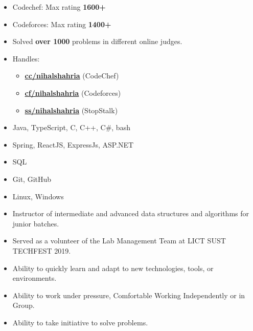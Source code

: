 \smallskip
\begin{itemize}
	\item Codechef: Max rating \textbf{1600+}
	\item Codeforces: Max rating \textbf{1400+}
	\item Solved \textbf{over 1000} problems in different online judges.
	\item Handles:
	      \begin{itemize}
	      	\item \href{https://www.codechef.com/users/nihalshahria}{\textbf{cc/nihalshahria}} (CodeChef)
	      	\item \href{https://codeforces.com/profile/nihalshahria}{\textbf {cf/nihalshahria}} (Codeforces)
	      	\item \href{https://www.stopstalk.com/user/profile/nihalshahria}{\textbf{ss/nihalshahria}} (StopStalk)
	      \end{itemize}
	              
\end{itemize}
\smallskip


\smallskip
\begin{itemize}
	\item Java, TypeScript, C, C++, C\#, bash
	\item Spring, ReactJS, ExpressJs, ASP.NET 
	\item SQL
	\item Git, GitHub
	\item Linux, Windows
\end{itemize}

\smallskip
\begin{itemize}
	\item Instructor of intermediate and advanced data structures and algorithms for junior batches.\smallskip
	\item Served as a volunteer of the Lab Management Team at LICT SUST TECHFEST 2019.
\end{itemize}
\smallskip


\smallskip
\begin{itemize}
	\item Ability to quickly learn and adapt to new technologies, tools, or environments.
	      \smallskip
	\item Ability to work under pressure, Comfortable Working Independently or in Group.
	      \smallskip
	\item Ability to take initiative to solve problems.
\end{itemize}
        
